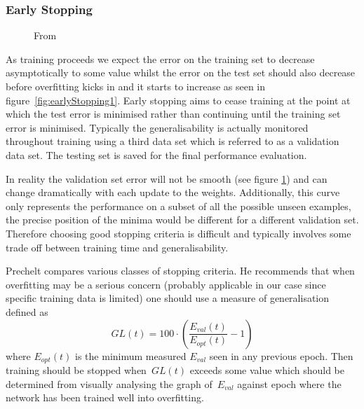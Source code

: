 \documentclass[11pt]{article} %
\begin{document}
\subsubsection{Early Stopping}
\begin{figure}
\centering
{}%
\qquad
{}%
\caption{From \cite{Prechelt2012}		\label{fig:earlyStopping} }
\end{figure}
As training proceeds we expect the error on the training set to decrease asymptotically to some value whilst the error on the test set should also decrease before overfitting kicks in and it starts to increase as seen in figure~\ref{fig:earlyStopping1}. Early stopping aims to cease training at the point at which the test error is minimised rather than continuing until the training set error is minimised. Typically the generalisability is actually monitored throughout training using a third data set which is referred to as a validation data set. The testing set is saved for the final performance evaluation.

In reality the validation set error will not be smooth (see figure \ref{fig:earlyStopping}) and can change dramatically with each update to the weights. Additionally, this curve only represents the performance on a subset of all the possible unseen examples, the precise position of the minima would be different for a different validation set. Therefore choosing good stopping criteria is difficult and typically involves some trade off between training time and generalisability.

Prechelt \cite{Prechelt2012} compares various classes of stopping criteria. He recommends that when overfitting may be a serious concern (probably applicable in our case since specific training data is limited) one should use a measure of generalisation defined as 
\begin{equation}
GL(t) = 100 \cdot (\frac{E_{val}(t)}{E_{opt}(t)}-1)
\end{equation}
where $E_{opt}(t)$ is the minimum measured $E_{val}$ seen in any previous epoch. Then training should be stopped when~$GL(t)$ exceeds some value which should be determined from visually analysing the graph of~$E_{val}$ against epoch where the network has been trained well into overfitting.
\end{document}

